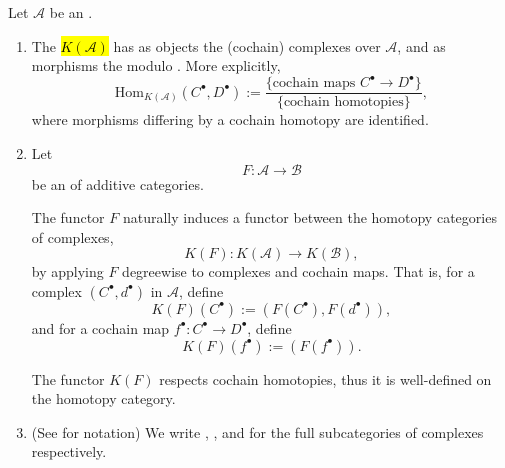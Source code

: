 
\begin{definition} \label{definition:homotopy_category_of_chain_complexes_of_an_additive_category}
Let $\mathcal{A}$ be an . 
\begin{enumerate}
    \item The  \hl{$K(\mathcal{A})$} has as objects the (cochain) complexes over $\mathcal{A}$, and as morphisms the  modulo . More explicitly,
    \[
    \mathrm{Hom}_{K(\mathcal{A})}(C^\bullet, D^\bullet) := \frac{\{\text{cochain maps } C^\bullet \to D^\bullet\}}{\{\text{cochain homotopies}\}},
    \]
    where morphisms differing by a cochain homotopy are identified.

    \item Let
    \[
    F: \mathcal{A} \to \mathcal{B}
    \]
    be an  of additive categories.

    The functor $F$ naturally induces a functor between the homotopy categories of complexes,
    \[
    K(F): K(\mathcal{A}) \to K(\mathcal{B}),
    \]
    by applying $F$ degreewise to complexes and cochain maps. That is, for a complex $(C^\bullet, d^\bullet)$ in $\mathcal{A}$, define
    \[
    K(F)(C^\bullet) := (F(C^\bullet), F(d^\bullet)),
    \]
    and for a cochain map $f^\bullet: C^\bullet \to D^\bullet$, define
    \[
    K(F)(f^\bullet) := (F(f^\bullet)).
    \]

    The functor $K(F)$ respects cochain homotopies, thus it is well-defined on the homotopy category.

    \item (See \cite[Cat\'egories d\'eriv\'ees Chapitre 1 2-3]{SGA4_5} for notation) We write , , and  for the full subcategories of  complexes respectively. 


\end{enumerate}
\end{definition}
